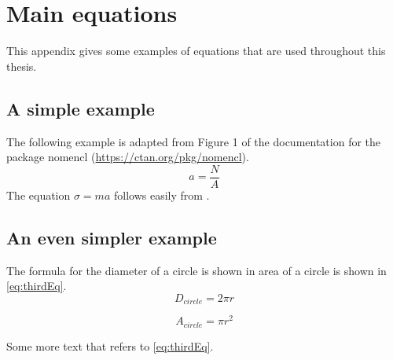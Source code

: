 \documentclass[nomenclature, english, bibtex]{kththesis}
\begin{document}
\chapter{Main equations}
\label{ch:NomenclatureExamples}
This appendix gives some examples of equations that are used throughout this thesis.
\section{A simple example}
The following example is adapted from Figure 1 of the documentation for the package nomencl (\url{https://ctan.org/pkg/nomencl}).
\begin{equation}\label{eq:mainEq}
a=\frac{N}{A}
\end{equation}
%
The equation $\sigma = m a$%
%
follows easily from .

\section{An even simpler example}
The formula for the diameter of a circle is shown in  area of a circle is shown in \cref{eq:thirdEq}.
\begin{equation}\label{eq:secondEq}
D_{circle}=2\pi r
\end{equation}
%
%

\begin{equation}\label{eq:thirdEq}
A_{circle}=\pi r^2
\end{equation}
%

Some more text that refers to \eqref{eq:thirdEq}.
\fi  %

\cleardoublepage
%


\cleardoublepage
% 

\begin{comment}
\ifxeorlua
\cleardoublepage

\fi
\end{comment}
\end{document}
